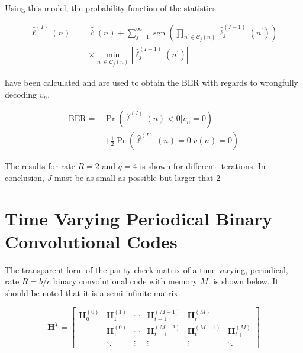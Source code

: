 \documentclass[11pt, oneside, dvipdfmx]{book}
\begin{document}
Using this model, the probability function of the statistics 

\begin{equation}
\begin{aligned} \hat{\ell}^{(I)}(n)=& \hat{\ell}(n)+\sum_{j=1}^{\infty} \operatorname{sgn}\left(\prod_{n^{\prime} \in \mathcal{C}_{j}(n)} \hat{\ell}_{j}^{(I-1)}\left(n^{\prime}\right)\right) \\ & \times \min _{n^{\prime} \in \mathcal{C}_{j}(n)}\left|\hat{\ell}_{j}^{(I-1)}\left(n^{\prime}\right)\right| \end{aligned}
\end{equation}

have been calculated and are used to obtain the BER with regards to wrongfully decoding $v_n$.

\begin{equation}
\begin{aligned} \mathrm{BER}=& \operatorname{Pr}\left(\hat{\ell}^{(I)}(n)<0 | v_{n}=0\right) \\ &+\frac{1}{2} \operatorname{Pr}\left(\hat{\ell}^{(I)}(n)=0 | v(n)=0\right) \end{aligned}
\end{equation}

The results for rate $R=2$ and $q=4$ is shown for different iterations. In conclusion, $J$ must be as small as possible but larger that $2$


\section{Time Varying Periodical Binary Convolutional Codes}

The transparent form of the parity-check matrix of a time-varying, periodical, rate $R=b/c$ binary convolutional code with memory $M$. is shown below. It should be noted that it is a semi-infinite matrix.

\begin{equation}
\boldsymbol{H}^{T}=\left[\begin{array}{cccccc}{\boldsymbol{H}_{0}^{(0)}} & {\boldsymbol{H}_{1}^{(1)}} & {\cdots} & {\boldsymbol{H}_{t-1}^{(M-1)}} & {\boldsymbol{H}_{t}^{(M)}} \\ {} & {\boldsymbol{H}_{1}^{(0)}} & {\cdots} & {\boldsymbol{H}_{t-1}^{(M-2)}} & {\boldsymbol{H}_{t}^{(M-1)}} & {\boldsymbol{H}_{t+1}^{(M)}} \\ {} & {\ddots} & {\vdots} & {\vdots} & {\vdots} & {\ddots}\end{array}\right]
\end{equation}
\end{document}
